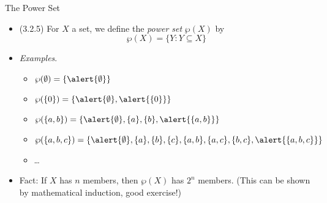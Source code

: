 \begin{frame}{The Power Set}

	\begin{itemize}
	
		\item (3.2.5) For $X$ a set, we define the \emph{power set} $\wp(X)$ by \[\wp(X)=\{Y:Y\subseteq X\}\]
		
		\item \emph{Examples}.
		
			\begin{itemize}
			
				\item $\wp(\emptyset)=\{\alert{\emptyset}\}$
				
				\item $\wp(\{0\})=\{\alert{\emptyset}, \alert{\{0\}}\}$
			
				\item $\wp(\{a,b\})=\{\alert{\emptyset}, \{a\}, \{b\},\alert{\{a,b\}}\}$
				\item $\wp(\{a,b,c\})=\{\alert{\emptyset}, \{a\}, \{b\}, \{c\}, \{a,b\}, \{a,c\}, \{b,c\}, \alert{\{a,b,c\}}\}$
				
				\item \dots
			
			\end{itemize}
			
		\item Fact: If $X$ has $n$ members, then $\wp(X)$ has $2^n$ members. (This can be shown by mathematical induction, good exercise!)
		

	\end{itemize}

\end{frame}

